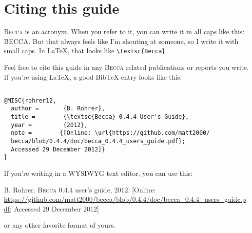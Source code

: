 \chapter{Citing this guide}

\textsc{Becca} is an acronym. When you refer to it, you can write it in all caps like this: BECCA. But that always feels like I'm shouting at someone, so I write it with small caps. In \LaTeX, that looks like \verb+\textsc{Becca} +

Feel free to cite this guide in any \textsc{Becca} related publications or reports you write. If you're using \LaTeX, a good BibTeX entry looks like this:

\begin{verbatim}

@MISC{rohrer12,
  author =       {B. Rohrer},
  title =        {\textsc{Becca} 0.4.4 User's Guide},
  year =         {2012},
  note =        {[Online: \url{https://github.com/matt2000/
  becca/blob/0.4.4/doc/becca_0.4.4_users_guide.pdf}; 
  Accessed 29 December 2012]}
}

\end{verbatim}

If you're writing in a WYSIWYG text editor, you can use this:

B. Rohrer. \textsc{Becca} 0.4.4 user's guide, 2012. [Online: \url{https://github.com/matt2000/becca/blob/0.4.4/doc/becca_0.4.4_users_guide.pdf}; Accessed 29 December 2012]

or any other favorite format of yours. 



 
